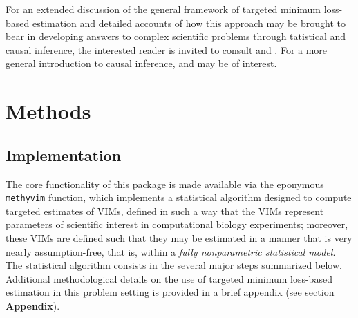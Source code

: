 \documentclass[9pt,a4paper,]{extarticle}
\theoremstyle{definition}
\theoremstyle{definition}
\theoremstyle{definition}
\theoremstyle{remark}
\begin{document}
For an extended discussion of the general framework of targeted minimum
loss-based estimation and detailed accounts of how this approach may be brought
to bear in developing answers to complex scientific problems through tatistical
and causal inference, the interested reader is invited to consult
\citet{vdl2011targeted} and \citet{vdl2018targeted}. For a more general introduction to causal
inference, \citet{pearl2009causality} and \citet{hernan2018causal} may be of interest.

\hypertarget{methods}{%
\section{Methods}\label{methods}}

\hypertarget{implementation}{%
\subsection{Implementation}\label{implementation}}

The core functionality of this package is made available via the eponymous
\texttt{methyvim} function, which implements a statistical algorithm designed to
compute targeted estimates of VIMs, defined in such a way that the VIMs
represent parameters of scientific interest in computational biology
experiments; moreover, these VIMs are defined such that they may be estimated in
a manner that is very nearly assumption-free, that is, within a \emph{fully
nonparametric statistical model}. The statistical algorithm consists in the
several major steps summarized below. Additional methodological details on the
use of targeted minimum loss-based estimation in this problem setting is
provided in a brief appendix (see section \textbf{Appendix}).
\end{document}
